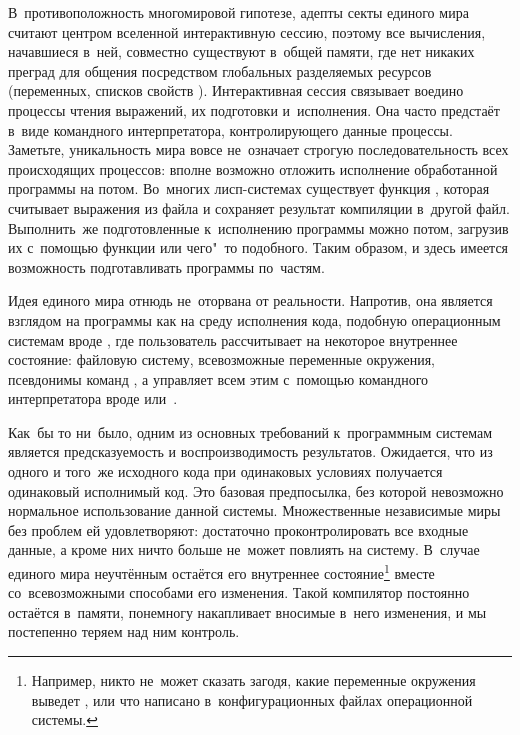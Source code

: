 В~противоположность многомировой гипотезе, адепты секты единого мира считают
центром вселенной интерактивную сессию, поэтому все вычисления, начавшиеся
в~ней, совместно существуют в~общей памяти, где нет никаких преград для общения
посредством глобальных разделяемых ресурсов (переменных, списков свойств
{\itp}). Интерактивная сессия связывает воедино процессы чтения выражений, их
подготовки и~исполнения. Она часто предстаёт в~виде командного интерпретатора,
контролирующего данные процессы. Заметьте, уникальность мира вовсе не~означает
строгую последовательность всех происходящих процессов: вполне возможно отложить
исполнение обработанной программы на потом. Во~многих лисп-системах существует
функция , которая считывает выражения из файла и сохраняет
результат компиляции в~другой файл. Выполнить~же подготовленные к~исполнению
программы можно потом, загрузив их с~помощью функции  или чего"~то
подобного. Таким образом, и здесь имеется возможность подготавливать программы
по~частям.

Идея единого мира отнюдь не~оторвана от реальности. Напротив, она является
взглядом на программы как на среду исполнения кода, подобную операционным
системам вроде \UNIX, где пользователь рассчитывает на некоторое внутреннее
состояние: файловую систему, всевозможные переменные окружения, псевдонимы
команд {\itd}, а управляет всем этим с~помощью командного интерпретатора
вроде  или~.

Как~бы то ни~было, одним из основных требований к~программным системам является
предсказуемость и воспроизводимость результатов. Ожидается, что из одного и
того~же исходного кода при одинаковых условиях получается одинаковый исполнимый
код. Это базовая предпосылка, без которой невозможно нормальное использование
данной системы. Множественные независимые миры без проблем ей удовлетворяют:
достаточно проконтролировать все входные данные, а кроме них ничто больше
не~может повлиять на систему. В~случае единого мира неучтённым остаётся его
внутреннее состояние\footnote{Например, никто не~может сказать загодя, какие
переменные окружения выведет , или что написано в~конфигурационных
файлах операционной системы.} вместе со~всевозможными способами его изменения.
Такой компилятор постоянно остаётся в~памяти, понемногу накапливает вносимые
в~него изменения, и мы постепенно теряем над ним контроль.

